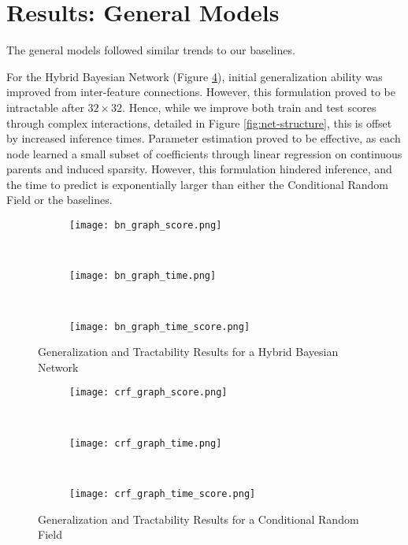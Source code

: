 \documentclass{article}
\begin{document}

\section{Results: General Models}
\label{sec:results-general}
The general models followed similar trends to our baselines.

For the Hybrid Bayesian Network (Figure \ref{fig:HBN}), initial generalization
ability was improved
from inter-feature connections. However, this formulation proved to be intractable
after $32 \times 32$. Hence, while we improve both train and test scores through
complex interactions, detailed in Figure \ref{fig:net-structure}, this is
offset by increased inference times. Parameter estimation proved to be effective,
as each node learned a small subset of coefficients through linear regression
on continuous parents and induced sparsity. However, this formulation hindered
inference, and the time to predict is exponentially larger than either the
Conditional Random Field or the baselines.

\begin{figure}
  \centering
  \begin{subfigure}[b]{0.3\textwidth}
    \centering
    \texttt{[image: bn\_graph\_score.png]}
    \caption*{}
    \label{fig:bn_graph_score}
  \end{subfigure}
  ~
  \begin{subfigure}[b]{0.3\textwidth}
    \centering
    \texttt{[image: bn\_graph\_time.png]}
    \caption*{}
    \label{fig:bn_graph_time}
  \end{subfigure}
  ~
  \begin{subfigure}[b]{0.3\textwidth}
    \centering
    \texttt{[image: bn\_graph\_time\_score.png]}
    \caption*{}
    \label{fig:bn_graph_time_score}
  \end{subfigure}
  \vspace{-10pt}
  \caption{Generalization and Tractability Results for a Hybrid Bayesian Network}
  \label{fig:HBN}
\end{figure}

\begin{figure}
  \centering
  \begin{subfigure}[b]{0.3\textwidth}
    \centering
    \texttt{[image: crf\_graph\_score.png]}
    \caption*{}
    \label{fig:crf_graph_score}
  \end{subfigure}
  ~
  \begin{subfigure}[b]{0.3\textwidth}
    \centering
    \texttt{[image: crf\_graph\_time.png]}
    \caption*{}
    \label{fig:crf_graph_time}
  \end{subfigure}
  ~
  \begin{subfigure}[b]{0.3\textwidth}
    \centering
    \texttt{[image: crf\_graph\_time\_score.png]}
    \caption*{}
    \label{fig:crf_graph_time_score}
  \end{subfigure}
  \vspace{-10pt}
  \caption{Generalization and Tractability Results for a Conditional Random Field}
  \label{fig:CRF}
\end{figure}
\end{document}

